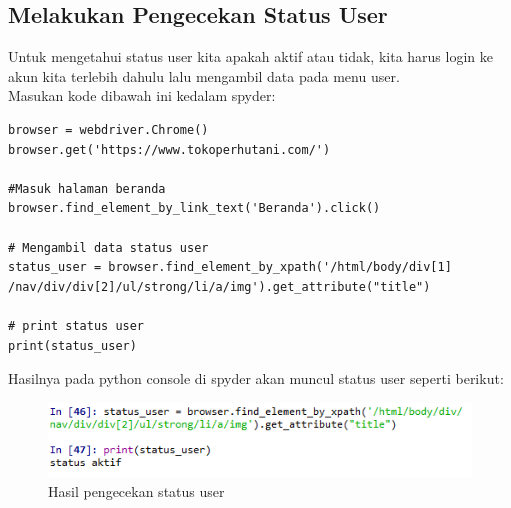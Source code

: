 \subsection{Melakukan Pengecekan Status User}
Untuk mengetahui status user kita apakah aktif atau tidak, kita harus login ke akun kita terlebih dahulu lalu mengambil data pada menu user.
\\
Masukan kode dibawah ini kedalam spyder:
\begin{verbatim}
browser = webdriver.Chrome()
browser.get('https://www.tokoperhutani.com/')

#Masuk halaman beranda
browser.find_element_by_link_text('Beranda').click()

# Mengambil data status user
status_user = browser.find_element_by_xpath('/html/body/div[1]
/nav/div/div[2]/ul/strong/li/a/img').get_attribute("title")

# print status user
print(status_user)
\end{verbatim}

Hasilnya pada python console di spyder akan muncul status user seperti berikut:
\begin{figure}[h]
	\centering
	\includegraphics[scale=0.7]{figures/T9_SU}
	\caption{Hasil pengecekan status user}
\end{figure}